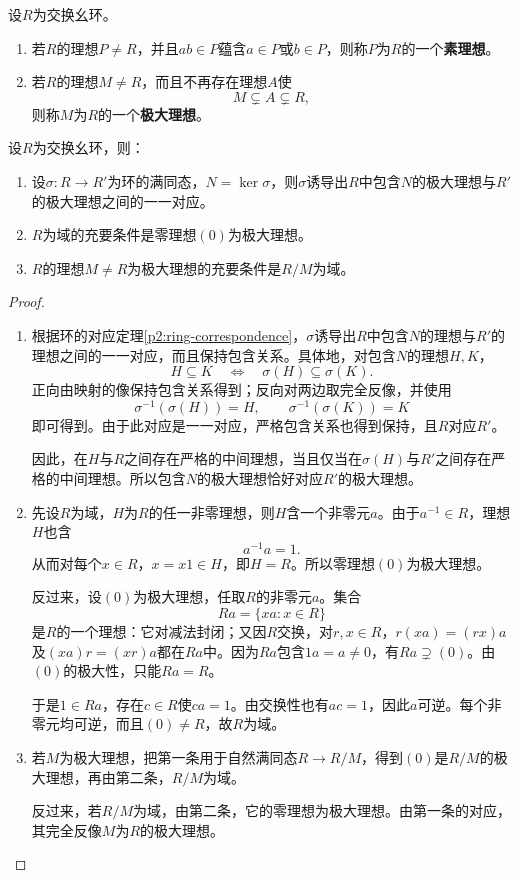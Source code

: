 \begin{definition}\label{p2:concept:c3-prime-maximal}
设$R$为交换幺环。
\begin{enumerate}
\item 若$R$的理想$P\ne R$，并且$ab\in P$蕴含$a\in P$或$b\in P$，则称$P$为$R$的一个\textbf{素理想}。
\item 若$R$的理想$M\ne R$，而且不再存在理想$A$使
\[
M\subsetneq A\subsetneq R,
\]
则称$M$为$R$的一个\textbf{极大理想}。
\end{enumerate}
\end{definition}


\begin{theorem}\label{p2:prime-maximal}
设$R$为交换幺环，则：
\begin{enumerate}
\item 设$\sigma:R\to R'$为环的满同态，$N=\ker\sigma$，则$\sigma$诱导出$R$中包含$N$的极大理想与$R'$的极大理想之间的一一对应。
\item $R$为域的充要条件是零理想$(0)$为极大理想。
\item $R$的理想$M\ne R$为极大理想的充要条件是$R/M$为域。
\end{enumerate}
\end{theorem}
\begin{proof}
	\begin{enumerate}
		\item 根据环的对应定理\ref{p2:ring-correspondence}，$\sigma$诱导出$R$中包含$N$的理想与$R'$的理想之间的一一对应，而且保持包含关系。具体地，对包含$N$的理想$H,K$，
		\[
		H\subseteq K\quad\Longleftrightarrow\quad\sigma(H)\subseteq\sigma(K).
		\]
		正向由映射的像保持包含关系得到；反向对两边取完全反像，并使用
		\[
		\sigma^{-1}(\sigma(H))=H,\qquad
		\sigma^{-1}(\sigma(K))=K
		\]
		即可得到。由于此对应是一一对应，严格包含关系也得到保持，且$R$对应$R'$。
		
		因此，在$H$与$R$之间存在严格的中间理想，当且仅当在$\sigma(H)$与$R'$之间存在严格的中间理想。所以包含$N$的极大理想恰好对应$R'$的极大理想。
		\item 先设$R$为域，$H$为$R$的任一非零理想，则$H$含一个非零元$a$。由于$a^{-1}\in R$，理想$H$也含
		\[
		a^{-1}a=1.
		\]
		从而对每个$x\in R$，$x=x1\in H$，即$H=R$。所以零理想$(0)$为极大理想。
		
		反过来，设$(0)$为极大理想，任取$R$的非零元$a$。集合
		\[
		Ra=\{xa:x\in R\}
		\]
		是$R$的一个理想：它对减法封闭；又因$R$交换，对$r,x\in R$，$r(xa)=(rx)a$及$(xa)r=(xr)a$都在$Ra$中。因为$Ra$包含$1a=a\ne0$，有$Ra\supsetneq(0)$。由$(0)$的极大性，只能$Ra=R$。
		
		于是$1\in Ra$，存在$c\in R$使$ca=1$。由交换性也有$ac=1$，因此$a$可逆。每个非零元均可逆，而且$(0)\ne R$，故$R$为域。
		\item 若$M$为极大理想，把第一条用于自然满同态$R\to R/M$，得到$(0)$是$R/M$的极大理想，再由第二条，$R/M$为域。
		
		反过来，若$R/M$为域，由第二条，它的零理想为极大理想。由第一条的对应，其完全反像$M$为$R$的极大理想。
	\end{enumerate}
\end{proof}

